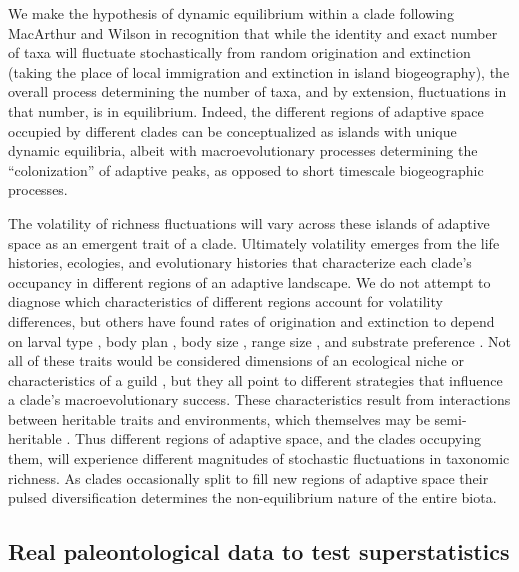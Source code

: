 \documentclass[12pt]{article}
\let\citep=\cite
\begin{document}
We make the hypothesis of dynamic equilibrium within a clade following
MacArthur and Wilson \citep{macWilson} in recognition that while the
identity and exact number of taxa will fluctuate stochastically from
random origination and extinction (taking the place of local
immigration and extinction in island biogeography), the overall
process determining the number of taxa, and by extension, fluctuations
in that number, is in equilibrium. Indeed, the different regions of
adaptive space occupied by different clades can be conceptualized as
islands with unique dynamic equilibria, albeit with macroevolutionary
processes determining the ``colonization'' of adaptive peaks, as
opposed to short timescale biogeographic processes.

The volatility of richness fluctuations will vary across these islands
of adaptive space as an emergent trait of a clade. Ultimately
volatility emerges from the life histories, ecologies, and
evolutionary histories that characterize each clade's occupancy in
different regions of an adaptive landscape. We do not attempt to
diagnose which characteristics of different regions account for
volatility differences, but others have found rates of origination and
extinction to depend on larval type \citep{jablonski2008}, body plan
\citep{erwin2012}, body size \citep{harnik2011}, range size
\citep{harnik2011, foote2008paleobiol}, and substrate preference
\citep{hopkins2014}. Not all of these traits would be considered
dimensions of an ecological niche or characteristics of a guild
\citep{bambach1983, bambach2007, bush2007}, but they all point to
different strategies that influence a clade's macroevolutionary
success. These characteristics result from interactions between
heritable traits and environments, which themselves may be
semi-heritable \citep{nicheCons}. Thus different regions of adaptive
space, and the clades occupying them, will experience different
magnitudes of stochastic fluctuations in taxonomic richness. As clades
occasionally split to fill new regions of adaptive space their pulsed
diversification determines the non-equilibrium nature of the entire
biota.




\subsection{Real paleontological data to test superstatistics}
\end{document}
